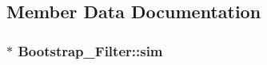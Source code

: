 \subsection{Member Data Documentation}
\hypertarget{class_bootstrap___filter_5b4cfb2f584027060dff43bc967cb77c}{
\subsubsection[{sim}]{$\ast$ {\bf Bootstrap\_\-Filter::sim}}}
\label{class_bootstrap___filter_5b4cfb2f584027060dff43bc967cb77c}


